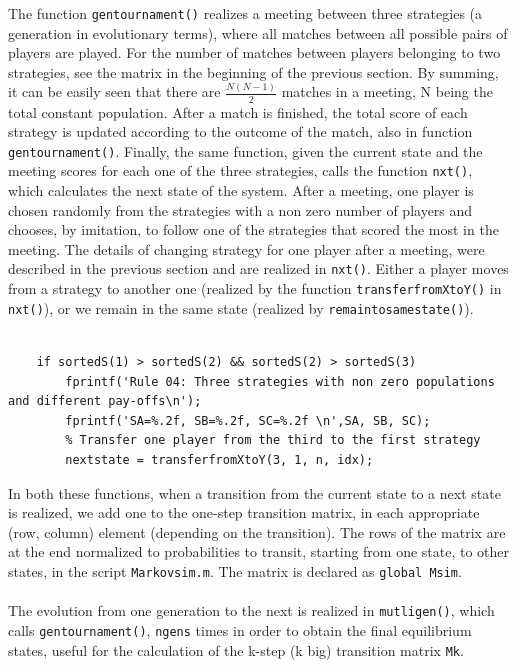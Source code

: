\documentclass[12pt]{article}
\begin{document}
The function \texttt{gentournament()} realizes  a meeting between three strategies (a generation in evolutionary terms), where all matches between all possible pairs of players are played. For the number of matches between players belonging to two strategies, see the matrix in the beginning of the previous section. By summing, it can be easily seen that there are $\frac{N(N-1)}{2}$ matches in a meeting, N being the total constant population. After a match is finished, the total score of each strategy is updated according to the outcome of the match, also in function \texttt{gentournament()}. Finally, the same function, given the current state and the meeting scores for each one of the three strategies, calls the function \texttt{nxt()}, which calculates the next state of the system. After a meeting, one player is chosen randomly from the strategies with a non zero number of players and chooses, by imitation, to follow one of the strategies that scored the most in the meeting. The details of changing strategy for one player after a meeting, were described in the previous section and are realized in \texttt{nxt()}. Either a player moves from a strategy to another one (realized by the function \texttt{transferfromXtoY()} in \texttt{nxt()}), or we remain in the same state (realized by \texttt{remaintosamestate()}).
\begin{lstlisting}[caption= Abstract example from nxt.m: Three strategies with non-zero populations and the same pay-offs]
    
    if sortedS(1) > sortedS(2) && sortedS(2) > sortedS(3)
        fprintf('Rule 04: Three strategies with non zero populations and different pay-offs\n');
        fprintf('SA=%.2f, SB=%.2f, SC=%.2f \n',SA, SB, SC);
        % Transfer one player from the third to the first strategy
        nextstate = transferfromXtoY(3, 1, n, idx);

\end{lstlisting}
In both these functions, when a transition from the current state to a next state is realized, we add one to the one-step transition matrix, in each appropriate (row, column) element (depending on the transition). The rows of the matrix are at the end normalized to probabilities to transit, starting from one state, to other states, in the script \texttt{Markovsim.m}. The matrix is declared as \texttt{global Msim}.
\\\\
The evolution from one generation to the next is realized in \texttt{mutligen()}, which calls \texttt{gentournament()}, \texttt{ngens} times in order to obtain the final equilibrium states, useful for the calculation of the k-step (k big) transition matrix \texttt{Mk}.
\end{document}
